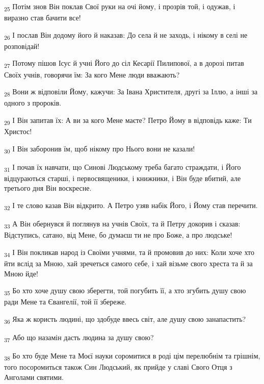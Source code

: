 \begin{tcolorbox}
\textsubscript{25} Потім знов Він поклав Свої руки на очі йому, і прозрів той, і одужав, і виразно став бачити все!
\end{tcolorbox}
\begin{tcolorbox}
\textsubscript{26} І послав Він додому його й наказав: До села й не заходь, і нікому в селі не розповідай!
\end{tcolorbox}
\begin{tcolorbox}
\textsubscript{27} Потому пішов Ісус й учні Його до сіл Кесарії Пилипової, а в дорозі питав Своїх учнів, говорячи їм: За кого Мене люди вважають?
\end{tcolorbox}
\begin{tcolorbox}
\textsubscript{28} Вони ж відповіли Йому, кажучи: За Івана Христителя, другі за Іллю, а інші за одного з пророків.
\end{tcolorbox}
\begin{tcolorbox}
\textsubscript{29} І Він запитав їх: А ви за кого Мене маєте? Петро Йому в відповідь каже: Ти Христос!
\end{tcolorbox}
\begin{tcolorbox}
\textsubscript{30} І Він заборонив їм, щоб нікому про Нього вони не казали!
\end{tcolorbox}
\begin{tcolorbox}
\textsubscript{31} І почав їх навчати, що Синові Людському треба багато страждати, і Його відцураються старші, і первосвященики, і книжники, і Він буде вбитий, але третього дня Він воскресне.
\end{tcolorbox}
\begin{tcolorbox}
\textsubscript{32} І те слово казав Він відкрито. А Петро узяв набік Його, і Йому став перечити.
\end{tcolorbox}
\begin{tcolorbox}
\textsubscript{33} А Він обернувся й поглянув на учнів Своїх, та й Петру докорив і сказав: Відступись, сатано, від Мене, бо думаєш ти не про Боже, а про людське!
\end{tcolorbox}
\begin{tcolorbox}
\textsubscript{34} І Він покликав народ із Своїми учнями, та й промовив до них: Коли хоче хто йти вслід за Мною, хай зречеться самого себе, і хай візьме свого хреста та й за Мною йде!
\end{tcolorbox}
\begin{tcolorbox}
\textsubscript{35} Бо хто хоче душу свою зберегти, той погубить її, а хто згубить душу свою ради Мене та Євангелії, той її збереже.
\end{tcolorbox}
\begin{tcolorbox}
\textsubscript{36} Яка ж користь людині, що здобуде ввесь світ, але душу свою занапастить?
\end{tcolorbox}
\begin{tcolorbox}
\textsubscript{37} Або що назамін дасть людина за душу свою?
\end{tcolorbox}
\begin{tcolorbox}
\textsubscript{38} Бо хто буде Мене та Моєї науки соромитися в роді цім перелюбнім та грішнім, того посоромиться також Син Людський, як прийде у славі Свого Отця з Анголами святими.
\end{tcolorbox}

